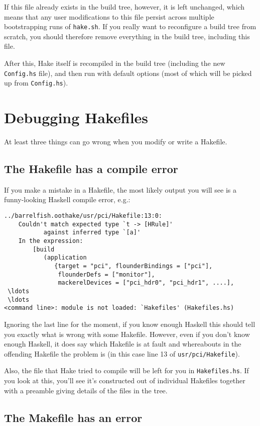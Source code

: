 \documentclass[a4paper,twoside]{report} %
\begin{document}
If this file already exists in the build tree, however, it is left
unchanged, which means that any user modifications to this file
persist across multiple bootstrapping runs of \texttt{hake.sh}.
If you really want to reconfigure a build tree from scratch, you
should therefore remove everything in the build tree, including this
file.

After this, Hake itself is recompiled in the build tree (including the
new \texttt{Config.hs} file), and then run with default options (most
of which will be picked up from \texttt{Config.hs}).

\chapter{Debugging Hakefiles}

At least three things can go wrong when you modify or write a
Hakefile.

\section{The Hakefile has a compile error}

If you make a mistake in a Hakefile, the most likely output you will
see is a funny-looking Haskell compile error, e.g.:
\begin{verbatim}
../barrelfish.oothake/usr/pci/Hakefile:13:0:
    Couldn't match expected type `t -> [HRule]'
           against inferred type `[a]'
    In the expression:
        [build
           (application
              {target = "pci", flounderBindings = ["pci"],
               flounderDefs = ["monitor"],
               mackerelDevices = ["pci_hdr0", "pci_hdr1", ....],
 \ldots
 \ldots
<command line>: module is not loaded: `Hakefiles' (Hakefiles.hs)
\end{verbatim}

Ignoring the last line for the moment, if you know enough Haskell this
should tell you exactly what is wrong with some Hakefile.   However,
even if you don't know enough Haskell, it does say which Hakefile is
at fault and whereabouts in the offending Hakefile the problem is (in
this case line 13 of \texttt{usr/pci/Hakefile}).

Also, the file that Hake tried to compile will be left for you in
\texttt{Hakefiles.hs}.  If you look at this, you'll see it's
constructed out of individual Hakefile{s} together with a preamble
giving details of the files in the tree.

\section{The Makefile has an error}
\end{document}
